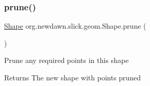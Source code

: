 \subsubsection{\texorpdfstring{prune()}{prune()}}
{\footnotesize\ttfamily \mbox{\hyperlink{classorg_1_1newdawn_1_1slick_1_1geom_1_1_shape}{Shape}} org.\+newdawn.\+slick.\+geom.\+Shape.\+prune (\begin{DoxyParamCaption}{ }\end{DoxyParamCaption})\hspace{0.3cm}{\ttfamily [inline]}}

Prune any required points in this shape

\begin{DoxyReturn}{Returns}
The new shape with points pruned 
\end{DoxyReturn}

